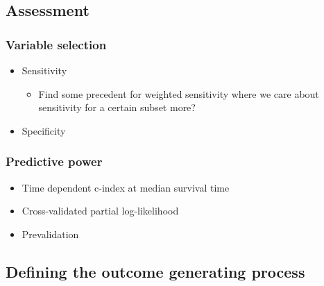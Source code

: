 \documentclass[11pt,a4paper]{article}
\let\cite\parencite
\begin{document}
\subsection{Assessment}
\subsubsection{Variable selection}
\begin{itemize}
    \item Sensitivity
    \begin{itemize}
        \item Find some precedent for weighted sensitivity where we care about sensitivity for a certain subset more? \cite{Hou2023}
    \end{itemize}
    \item Specificity 
\end{itemize}
\subsubsection{Predictive power}
\begin{itemize}
    \item Time dependent c-index at median survival time \cite{Wolbers2014}
    \item Cross-validated partial log-likelihood \cite{HouwelingenSauerbrei2013, Nicolaie2013, Houwelingen2006}
    \item Prevalidation \cite{TibshiraniEfron2002, Tang2017}
\end{itemize}


\subsection{Defining the outcome generating process}
\end{document}

